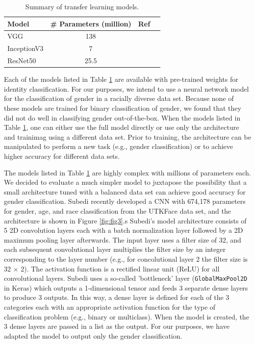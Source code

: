 \documentclass[obeyspaces, spaces, fleqn,10pt]{SelfArx} %
\begin{document}
\begin{table}[hbt]
\caption{Summary of transfer learning models.}
\centering
\begin{tabular}{lclc}
\toprule
Model & \# Parameters (million) & Ref \\
\midrule
VGG & 138 & \cite{Simonyan14c} \\
InceptionV3 & 7 & \cite{inceptionv3} \\
ResNet50 & 25.5 & \cite{resnet} \\
\bottomrule
\end{tabular}
\label{tab:tab2}
\end{table}

\noindent Each of the models listed in Table \ref{tab:tab2} are available with pre-trained weights for identity classification. For our purposes, we intend to use a neural network model for the classification of gender in a racially diverse data set. Because none of these models are trained for binary classification of gender, we found that they did not do well in classifying gender out-of-the-box. When the models listed in Table \ref{tab:tab2}, one can either use the full model directly or use only the architecture and trainimag using a different data set. Prior to training, the architecture can be manipulated to perform a new task (e.g., gender classification) or to achieve higher accuracy for different data sets. 

The models listed in Table \ref{tab:tab2} are highly complex with millions of parameters each. We decided to evaluate a much simpler model to juxtapose the possibility that a small architecture tuned with a balanced data set can achieve good accuracy for gender classification. Subedi recently developed a CNN with 674,178 parameters for gender, age, and race classification from the UTKFace data set, and the architecture is shown in Figure \ref{fig:fig3}.s \cite{subedi} Subedi's model architecture consists of 5 2D convolution layers each with a batch normalization layer followed by a 2D maximum pooling layer afterwards. The input layer uses a filter size of 32, and each subsequent convolutional layer multiplies the filter size by an integer corresponding to the layer number (e.g., for concolutional layer 2 the filter size is 32 $\times$ 2). The activation function is a rectified linear unit (ReLU) for all convolutional layers. Subedi uses a so-called 'bottleneck' layer (\texttt{GlobalMaxPool2D} in Keras) which outputs a 1-dimensional tensor and feeds 3 separate dense layers to produce 3 outputs. In this way, a dense layer is defined for each of the 3 categories each with an appropriate activation function for the type of classification problem (e.g., binary or multiclass). When the model is created, the 3 dense layers are passed in a list as the output. For our purposes, we have adapted the model to output only the gender classification.
\end{document}
